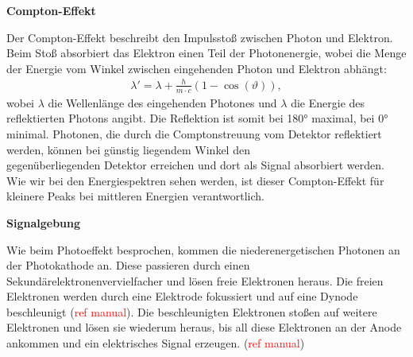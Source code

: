\documentclass[%
aps,
onecolumn,
11pt,
tightenlines,
nofootinbib,
superscriptaddress,
floatfix,
prd,
]{revtex4-2}
\begin{document}
\textbf{Compton-Effekt}\par
Der Compton-Effekt beschreibt den Impulsstoß zwischen Photon und Elektron. Beim Stoß absorbiert das Elektron einen Teil der Photonenergie, wobei die Menge der Energie vom Winkel zwischen eingehenden Photon und Elektron abhängt:
\begin{align*}
	\lambda ' = \lambda + \frac{h}{m\cdot c} \left( 1-\cos (\vartheta) \right),
\end{align*}
wobei $\lambda$ die Wellenlänge des eingehenden Photones und $\lambda$ die Energie des reflektierten Photons angibt. Die Reflektion ist somit bei 180° maximal, bei 0° minimal. Photonen, die durch die Comptonstreuung vom Detektor reflektiert werden, können bei günstig liegendem Winkel den \\ gegenüberliegenden Detektor erreichen und dort als Signal absorbiert werden. Wie wir bei den Energiespektren sehen werden, ist dieser Compton-Effekt für kleinere Peaks bei mittleren Energien verantwortlich.\vspace{15pt}\par
\textbf{Signalgebung}\par
Wie beim Photoeffekt besprochen, kommen die niederenergetischen Photonen an der Photokathode an. Diese passieren durch einen Sekundärelektronenvervielfacher und lösen freie Elektronen heraus. Die freien Elektronen werden durch eine Elektrode fokussiert und auf eine Dynode beschleunigt (\textcolor{red}{ref manual}). Die beschleunigten Elektronen stoßen auf weitere Elektronen und lösen sie wiederum heraus, bis all diese Elektronen an der Anode ankommen und ein elektrisches Signal erzeugen. (\textcolor{red}{ref manual})
\end{document}
